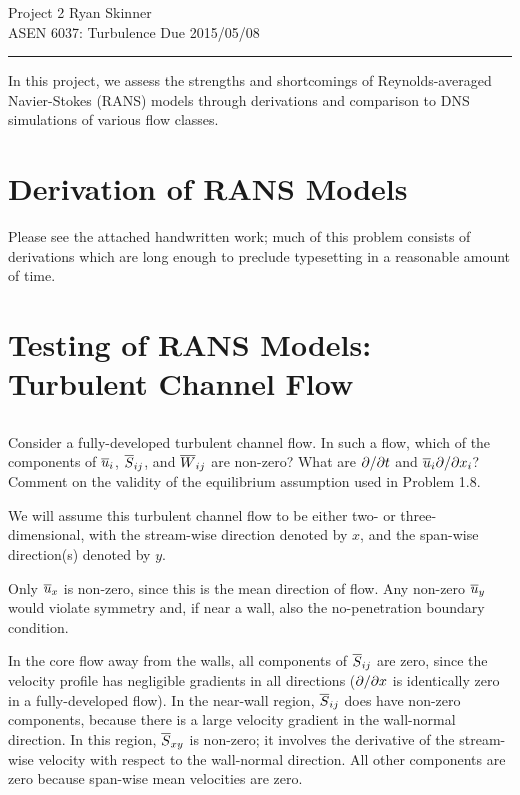 \documentclass[11pt]{article}
\begin{document}
\pagestyle{fancyplain}
\lhead{}
\chead{}
\rhead{}
\cfoot{\thepage}

\noindent
{\Large \color{blue} Project 2}
\hfill
{\large Ryan Skinner}
\\[0.5ex]
{\large ASEN 6037: Turbulence}
\hfill
{\large Due 2015/05/08}
\hrule
\vspace{12pt}

In this project, we assess the strengths and shortcomings of Reynolds-averaged Navier-Stokes (RANS) models through derivations and comparison to DNS simulations of various flow classes.

\section{Derivation of RANS Models}

Please see the attached handwritten work; much of this problem consists of derivations which are long enough to preclude typesetting in a reasonable amount of time.

\section{Testing of RANS Models: Turbulent Channel Flow}

\subsection{}

Consider a fully-developed turbulent channel flow. In such a flow, which of the components of $\overline{u}_i$, $\overline{S}_{ij}$, and $\overline{W}_{ij}$ are non-zero? What are $\partial  / \partial t$ and $\overline{u}_i \partial  / \partial x_i$? Comment on the validity of the equilibrium assumption used in Problem 1.8.

We will assume this turbulent channel flow to be either two- or three-dimensional, with the stream-wise direction denoted by $x$, and the span-wise direction(s) denoted by $y$.

Only $\overline{u}_x$ is non-zero, since this is the mean direction of flow. Any non-zero $\overline{u}_y$ would violate symmetry and, if near a wall, also the no-penetration boundary condition.

In the core flow away from the walls, all components of $\overline{S}_{ij}$ are zero, since the velocity profile has negligible gradients in all directions ($\partial  / \partial x$ is identically zero in a fully-developed flow). In the near-wall region, $\overline{S}_{ij}$ does have non-zero components, because there is a large velocity gradient in the wall-normal direction. In this region, $\overline{S}_{xy}$ is non-zero; it involves the derivative of the stream-wise velocity with respect to the wall-normal direction. All other components are zero because span-wise mean velocities are zero.
\end{document}
